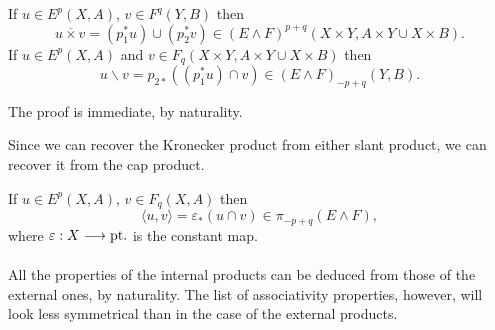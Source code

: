 \documentclass[../main]{subfiles}
\begin{document}
\begin{proposition}\label{prop:p3ch09.13}
If $u \in E^p(X, A)$, $v \in F^q(Y, B)$ then \[u \overline \times v = (p_1^\ast u) \cup (p_2^\ast v) \in (E \wedge F)^{p + q}(X \times Y, A \times Y \cup X \times B).\] If $u \in E^p(X, A)$ and $v \in F_q(X \times Y, A \times Y \cup X \times B)$ then \[u \backslash v = p_{2\ast} ((p_1^\ast u) \cap v) \in (E \wedge F)_{-p + q}(Y, B).\]
\end{proposition}

The proof is immediate, by naturality. 

Since we can recover the Kronecker product from either slant product, we can recover it from the cap product. 

\begin{proposition}\label{prop:p3ch09.14}
If $u \in E^p(X, A)$, $v \in F_q(X, A)$ then \[\langle u, v\rangle = \varepsilon_\ast (u \cap v) \in \pi_{-p + q}(E \wedge F),\] where $\varepsilon : X \lar{} \mathrm{pt}.$ is the constant map.
\end{proposition}

All the properties of the internal products can be deduced from those of the external ones, by naturality. The list of associativity properties, however, will look less symmetrical than in the case of the external products.
\end{document}
